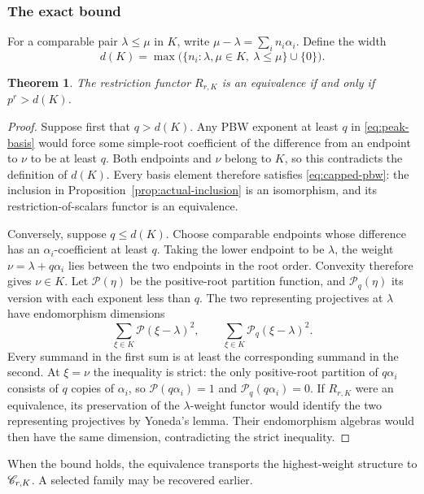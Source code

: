 \documentclass[11pt,reqno]{amsart}
\newtheorem{theorem}{Theorem}[section]
\theoremstyle{definition}
\theoremstyle{remark}
\numberwithin{equation}{section}
\begin{document}
\subsubsection{The exact bound}
For a comparable pair $\lambda\leq\mu$ in $K$, write
$\mu-\lambda=\sum_i n_i\alpha_i$. Define the width
\[
 d(K)=\max\bigl(\{n_i:\lambda,\mu\in K,
                          \ \lambda\leq\mu\}\cup\{0\}\bigr).
\]

\begin{theorem}\label{thm:frobenius}
The restriction functor $R_{r,K}$ is an equivalence if and
only if $p^r>d(K)$.
\end{theorem}

\begin{proof}
Suppose first that $q>d(K)$. Any PBW exponent at least $q$ in
\eqref{eq:peak-basis} would force some simple-root coefficient
of the difference from an endpoint to $\nu$ to be at least $q$.
Both endpoints and $\nu$ belong to $K$, so this contradicts the
definition of $d(K)$. Every basis element therefore satisfies
\eqref{eq:capped-pbw}: the inclusion in Proposition~\ref{prop:actual-inclusion}
is an isomorphism, and its restriction-of-scalars functor is an
equivalence.

Conversely, suppose $q\leq d(K)$. Choose comparable endpoints
whose difference has an $\alpha_i$-coefficient at least $q$.
Taking the lower endpoint to be $\lambda$, the weight
$\nu=\lambda+q\alpha_i$ lies between the two endpoints in the root
order. Convexity therefore gives $\nu\in K$.
Let $\mathcal P(\eta)$ be the positive-root partition function,
and $\mathcal P_q(\eta)$ its version with each exponent less
than $q$. The two representing projectives at $\lambda$ have
endomorphism dimensions
\[
 \sum_{\xi\in K}\mathcal P(\xi-\lambda)^2,
 \qquad
 \sum_{\xi\in K}\mathcal P_q(\xi-\lambda)^2.
\]
Every summand in the first sum is at least the corresponding
summand in the second. At $\xi=\nu$ the inequality is strict:
the only positive-root partition of $q\alpha_i$ consists of
$q$ copies of $\alpha_i$, so
$\mathcal P(q\alpha_i)=1$ and $\mathcal P_q(q\alpha_i)=0$.
If $R_{r,K}$ were an equivalence, its preservation of the
$\lambda$-weight functor would identify the two representing
projectives by Yoneda's lemma. Their endomorphism algebras would then
have the same dimension, contradicting the strict inequality.
\end{proof}

When the bound holds, the equivalence transports the highest-weight
structure to $\mathscr C_{r,K}$. A selected family may be recovered earlier.
\end{document}
